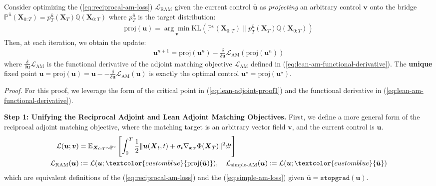 \documentclass{article}
\newcommand{\bluetext}[1]{\textcolor{customblue}{#1}}
\begin{document}
\begin{proposition}\label{prop:convergence-reciprocal-am}
    Consider optimizing the (\ref{eq:reciprocal-am-loss}) $\mathcal{L}_{\text{RAM}}$ given the current control $\bar{\boldsymbol{u}}$ as \textit{projecting} an arbitrary control $\boldsymbol{v}$ onto the bridge $\mathbb{P}^{\bar{u}}(\boldsymbol{X}_{0:T})=p^{\bar{u}}_T(\boldsymbol{X}_T)\mathbb{Q}(\boldsymbol{X}_{0:T})$ where $p_T^{\bar{u}}$ is the target distribution: 
    \begin{align}
        \text{proj}(\boldsymbol{u})=\underset{\boldsymbol{v}}{\arg\min}\text{KL}\left(\mathbb{P}^v(\boldsymbol{X}_{0:T})\|p^{\bar{u}}_T(\boldsymbol{X}_T)\mathbb{Q}(\boldsymbol{X}_{0:T})\right)
    \end{align}
    Then, at each iteration, we obtain the update:
    \begin{align}
        \boldsymbol{u}^{n+1}=\text{proj}(\boldsymbol{u}^n)-\frac{\delta}{\delta \boldsymbol{u}}\mathcal{L}_{\text{AM}}(\text{proj}(\boldsymbol{u}^n) )\label{eq:reciprocal-am-proj}
    \end{align}
    where $\frac{\delta}{\delta \boldsymbol{u}}\mathcal{L}_{\text{AM}}$ is the functional derivative of the adjoint matching objective $\mathcal{L}_{\text{AM}}$ defined in (\ref{eq:lean-am-functional-derivative}). The \textbf{unique} fixed point $\boldsymbol{u}=\text{proj}(\boldsymbol{u})=\boldsymbol{u}--\frac{\delta}{\delta \boldsymbol{u}}\mathcal{L}_{\text{AM}}(\boldsymbol{u})$ is exactly the optimal control $\boldsymbol{u}^\star=\text{proj}(\boldsymbol{u}^\star)$.
\end{proposition}
\textit{Proof.}
For this proof, we leverage the form of the critical point in (\ref{eq:lean-adjoint-proof1}) and the functional derivative in (\ref{eq:lean-am-functional-derivative}). 

\textbf{Step 1: Unifying the Reciprocal Adjoint and Lean Adjoint Matching Objectives.} 
First, we define a more general form of the reciprocal adjoint matching objective, where the matching target is an arbitrary vector field $\boldsymbol{v}$, and the current control is $\boldsymbol{u}$. 
\begin{align}
    \mathcal{L}(\boldsymbol{u}; \boldsymbol{v})&=\mathbb{E}_{\boldsymbol{X}_{0:T}\sim \mathbb{P}^v}\left[\int_0^T\frac{1}{2}\|\boldsymbol{u}(\boldsymbol{X}_t,t)+\sigma_t\nabla_{\boldsymbol{x}_T}\Phi(\boldsymbol{X}_T)\|^2dt\right]\\
    \mathcal{L}_{\text{RAM}}(\boldsymbol{u})&:=\mathcal{L}(\boldsymbol{u}; \bluetext{\text{proj}(\bar{\boldsymbol{u}})}), \quad \mathcal{L}_{\text{simple-AM}}(\boldsymbol{u}):=\mathcal{L}(\boldsymbol{u}; \bluetext{\bar{\boldsymbol{u}}})\label{eq:ram-am-equal}
\end{align}
which are equivalent definitions of the (\ref{eq:reciprocal-am-loss}) and the (\ref{eq:simple-am-loss}) given $\bar{\boldsymbol{u}}=\texttt{stopgrad}(\boldsymbol{u})$.
\end{document}
